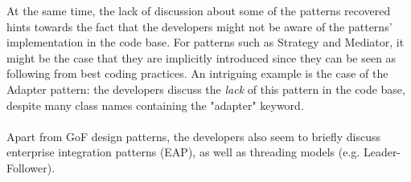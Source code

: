 At the same time, the lack of discussion about some of the patterns recovered hints towards the fact that the developers might not be aware of the patterns' implementation in the code base. For patterns such as Strategy and Mediator, it might be the case that they are implicitly introduced since they can be seen as following from best coding practices. An intriguing example is the case of the Adapter pattern: the developers discuss the \textit{lack} of this pattern in the code base, despite many class names containing the "adapter" keyword. \\\\
Apart from GoF design patterns, the developers also seem to briefly discuss enterprise integration patterns (EAP), as well as threading models (e.g. Leader-Follower).